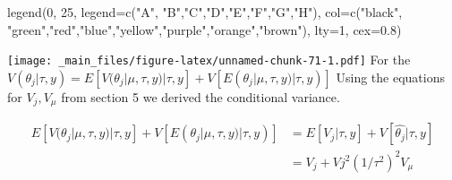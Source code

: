\documentclass[
]{book}
\newenvironment{Shaded}{\begin{snugshade}}{\end{snugshade}}
\newcommand{\AttributeTok}[1]{\textcolor[rgb]{0.77,0.63,0.00}{#1}}
\newcommand{\DecValTok}[1]{\textcolor[rgb]{0.00,0.00,0.81}{#1}}
\newcommand{\FloatTok}[1]{\textcolor[rgb]{0.00,0.00,0.81}{#1}}
\newcommand{\FunctionTok}[1]{\textcolor[rgb]{0.00,0.00,0.00}{#1}}
\newcommand{\NormalTok}[1]{#1}
\newcommand{\StringTok}[1]{\textcolor[rgb]{0.31,0.60,0.02}{#1}}
\theoremstyle{definition}
\theoremstyle{definition}
\theoremstyle{definition}
\theoremstyle{definition}
\theoremstyle{remark}
\begin{document}
\begin{Shaded}
\begin{Highlighting}[]
\FunctionTok{legend}\NormalTok{(}\DecValTok{0}\NormalTok{, }\DecValTok{25}\NormalTok{, }
       \AttributeTok{legend=}\FunctionTok{c}\NormalTok{(}\StringTok{"A"}\NormalTok{, }\StringTok{"B"}\NormalTok{,}\StringTok{"C"}\NormalTok{,}\StringTok{"D"}\NormalTok{,}\StringTok{"E"}\NormalTok{,}\StringTok{"F"}\NormalTok{,}\StringTok{"G"}\NormalTok{,}\StringTok{"H"}\NormalTok{),}
       \AttributeTok{col=}\FunctionTok{c}\NormalTok{(}\StringTok{"black"}\NormalTok{, }\StringTok{"green"}\NormalTok{,}\StringTok{"red"}\NormalTok{,}\StringTok{"blue"}\NormalTok{,}\StringTok{"yellow"}\NormalTok{,}\StringTok{"purple"}\NormalTok{,}\StringTok{"orange"}\NormalTok{,}\StringTok{"brown"}\NormalTok{), }\AttributeTok{lty=}\DecValTok{1}\NormalTok{, }\AttributeTok{cex=}\FloatTok{0.8}\NormalTok{)}
\end{Highlighting}
\end{Shaded}

\texttt{[image: \_main\_files/figure-latex/unnamed-chunk-71-1.pdf]}
For the \(V(\theta_j | \tau,y) = E[V(\theta_j | \mu,\tau,y)|\tau,y] + V[E(\theta_j | \mu,\tau,y)|\tau,y)]\) Using the equations for \(V_j , V_\mu\) from section 5 we derived the conditional variance.

\[
\begin{aligned}
E[V(\theta_j | \mu,\tau,y)|\tau,y] + V[E(\theta_j | \mu,\tau,y)|\tau,y)] &= E[V_j | \tau, y] +V[\hat{\theta_j}| \tau, y] \\
&= V_j +Vj^2(1/\tau^2)^2V_\mu
\end{aligned}
\]
\end{document}
